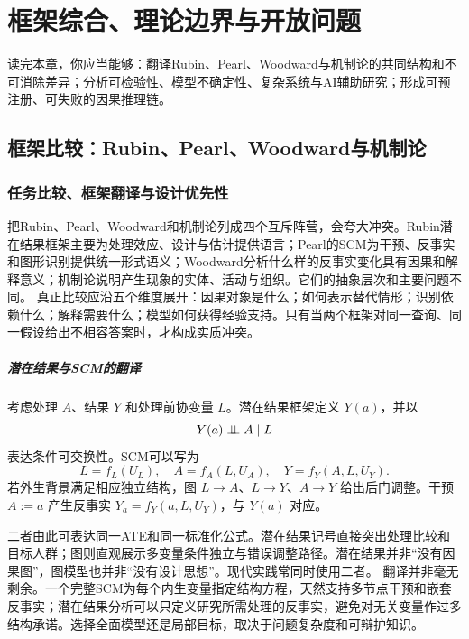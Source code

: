 \chapter{框架综合、理论边界与开放问题}
\label{ch:synthesis}

\begin{learninggoals}
读完本章，你应当能够：翻译Rubin、Pearl、Woodward与机制论的共同结构和不可消除差异；分析可检验性、模型不确定性、复杂系统与AI辅助研究；形成可预注册、可失败的因果推理链。
\end{learninggoals}

\section{框架比较：Rubin、Pearl、Woodward与机制论}

\subsection{任务比较、框架翻译与设计优先性}

把Rubin、Pearl、Woodward和机制论列成四个互斥阵营，会夸大冲突。Rubin潜在结果框架主要为处理效应、设计与估计提供语言；Pearl的SCM为干预、反事实和图形识别提供统一形式语义；Woodward分析什么样的反事实变化具有因果和解释意义；机制论说明产生现象的实体、活动与组织。它们的抽象层次和主要问题不同。
真正比较应沿五个维度展开：因果对象是什么；如何表示替代情形；识别依赖什么；解释需要什么；模型如何获得经验支持。只有当两个框架对同一查询、同一假设给出不相容答案时，才构成实质冲突。

\paragraph{潜在结果与SCM的翻译}

考虑处理 $A$、结果 $Y$ 和处理前协变量 $L$。潜在结果框架定义 $Y(a)$，并以
\[
Y(a)\mathrel{\perp\!\!\!\perp} A\mid L
\]
表达条件可交换性。SCM可以写为
\[
L=f_L(U_L),\quad A=f_A(L,U_A),\quad
Y=f_Y(A,L,U_Y).
\]
若外生背景满足相应独立结构，图 $L\rightarrow A$、$L\rightarrow Y$、$A\rightarrow Y$ 给出后门调整。干预 $A:=a$ 产生反事实 $Y_a=f_Y(a,L,U_Y)$，与 $Y(a)$ 对应。

二者由此可表达同一ATE和同一标准化公式。潜在结果记号直接突出处理比较和目标人群；图则直观展示多变量条件独立与错误调整路径。潜在结果并非“没有因果图”，图模型也并非“没有设计思想”。现代实践常同时使用二者。
翻译并非毫无剩余。一个完整SCM为每个内生变量指定结构方程，天然支持多节点干预和嵌套反事实；潜在结果分析可以只定义研究所需处理的反事实，避免对无关变量作过多结构承诺。选择全面模型还是局部目标，取决于问题复杂度和可辩护知识。

